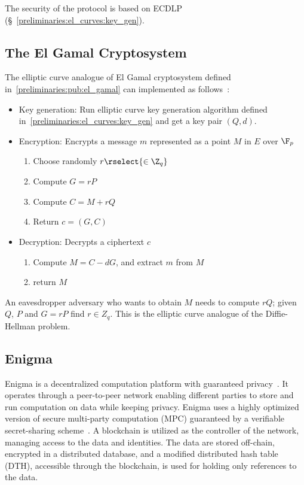 The security of the protocol is based on ECDLP (§~\ref{preliminaries:el_curves:key_gen}).

\subsection{The El Gamal Cryptosystem}
\label{preliminaries:el_curves:el_gamal}

The elliptic curve analogue of El Gamal cryptosystem defined in~\ref{preliminaries:pub:el_gamal} can implemented as follows~\cite{elliptic_curves_2}:

\begin{itemize}
  \item Key generation: Run elliptic curve key generation algorithm defined in~\ref{preliminaries:el_curves:key_gen} and get a key pair $(Q, d)$.
  \item Encryption: Encrypts a message $m$ represented as a point $M$ in $E$ over $\F_p$
    \begin{enumerate}
      \item Choose randomly $r \rselect{\in \Z_q}$
      \item Compute $G = rP$
      \item Compute $C = M + rQ$
      \item Return $c = (G, C)$
    \end{enumerate}
  \item Decryption: Decrypts a ciphertext $c$
    \begin{enumerate}
      \item Compute $M = C - dG$, and extract $m$ from $M$
      \item return $M$
    \end{enumerate}
\end{itemize}

An eavesdropper adversary who wants to obtain $M$ needs to compute $rQ$; given $Q$, $P$ and $G = rP$ find $r \in Z_q$. This is the elliptic curve analogue of the Diffie-Hellman problem.

\subsection{Enigma}\label{blockchain:impl:enigma}

Enigma is a decentralized computation platform with guaranteed privacy~\cite{DBLP:journals/corr/ZyskindNP15}. It operates through a peer-to-peer network enabling
different parties to store and run computation on data while keeping privacy. Enigma uses a highly optimized version of secure multi-party computation (MPC)
guaranteed by a verifiable secret-sharing scheme~\cite{DBLP:journals/corr/ZyskindNP15}. A blockchain is utilized as the controller of the network, managing access to the data and identities.
The data are stored off-chain, encrypted in a distributed database, and a modified distributed hash table (DTH), accessible through the blockchain, is used for holding only references to the data.
